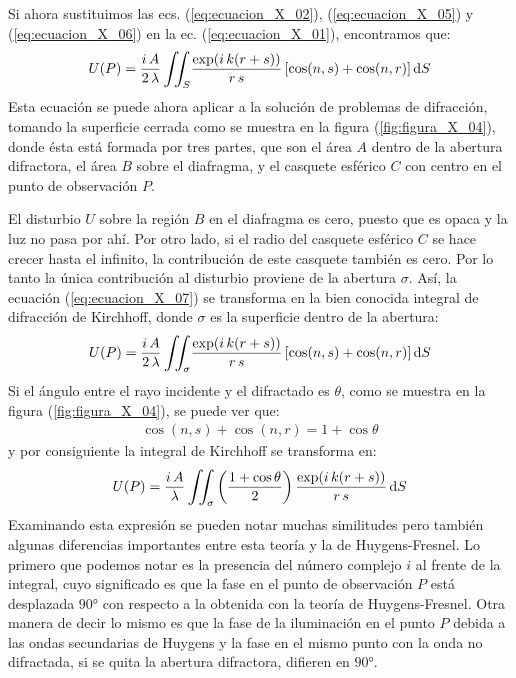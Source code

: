 \documentclass[14pt]{extarticle}
\def\scaleiint#1{\vcenter{\hbox{\scaleto[6ex]{\displaystyle\iint}{#1}}}}
\def\bs{\mkern-12mu}
\begin{document}
Si ahora sustituimos las ecs. (\ref{eq:ecuacion_X_02}), (\ref{eq:ecuacion_X_05}) y (\ref{eq:ecuacion_X_06}) en la ec. (\ref{eq:ecuacion_X_01}), encontramos que:
\begin{align}
U (P) = \dfrac{i \, A}{2 \, \lambda} \, \scaleiint{6ex}_{\bs S} \dfrac{\exp(i \, k (r + s))}{r \, s} \, [\cos (n, s) + \cos (n, r)] \dd{S}
\label{eq:ecuacion_X_07}
\end{align}
Esta ecuación se puede ahora aplicar a la solución de problemas de difracción, tomando la superficie cerrada como se muestra en la figura (\ref{fig:figura_X_04}), donde ésta está formada por tres partes, que son el área $A$ dentro de la abertura difractora, el área $B$ sobre el diafragma, y el casquete esférico $C$ con centro en el punto de observación $P$.
\par
El disturbio $U$ sobre la región $B$ en el diafragma es cero, puesto que es opaca y la luz no pasa por ahí. Por otro lado, si el radio del casquete esférico $C$ se hace crecer hasta el infinito, la contribución de este casquete también es cero. Por lo tanto la única contribución al disturbio proviene de la abertura $\sigma$. Así, la ecuación (\ref{eq:ecuacion_X_07}) se transforma en la bien conocida integral de difracción de Kirchhoff, donde $\sigma$ es la superficie dentro de la abertura:
\begin{align}
U (P) = \dfrac{i \, A}{2 \, \lambda} \, \scaleiint{6ex}_{\bs \sigma} \dfrac{\exp(i \, k (r + s))}{r \, s} \, [\cos (n, s) + \cos (n, r)] \dd{S}
\label{eq:ecuacion_X_08}
\end{align}
Si el ángulo entre el rayo incidente y el difractado es $\theta$, como se muestra en la figura (\ref{fig:figura_X_04}), se puede ver que:
\begin{align}
\cos (n, s) + \cos (n, r) = 1 + \cos \theta
\label{eq:ecuacion_X_09}
\end{align}
y por consiguiente la integral de Kirchhoff se transforma en:
\begin{align}
U (P) = \dfrac{i \, A}{\lambda} \, \scaleiint{6ex}_{\bs \sigma} \left( \dfrac{1 + \cos \theta}{2} \right) \dfrac{\exp(i \, k (r + s))}{r \, s} \dd{S}
\label{eq:ecuacion_X_10}
\end{align}
Examinando esta expresión se pueden notar muchas similitudes pero también algunas diferencias importantes entre esta teoría y la de Huygens-Fresnel. Lo primero que podemos notar es la presencia del número complejo $i$ al frente de la integral, cuyo significado es que la fase en el punto de observación $P$ está desplazada $\ang{90}$ con respecto a la obtenida con la teoría de Huygens-Fresnel. Otra manera de decir lo mismo es que la fase de la iluminación en el punto $P$ debida a las ondas secundarias de Huygens y la fase en el mismo punto con la onda no difractada, si se quita la abertura difractora, difieren en $\ang{90}$.
\end{document}
